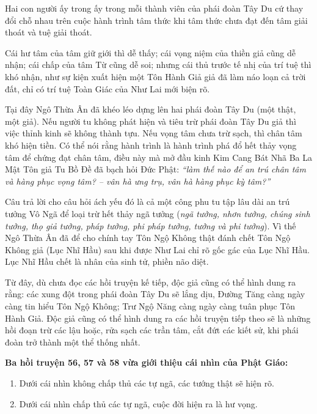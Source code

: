 Hai con người ấy trong ấy trong mỗi thành viên của phái đoàn Tây Du cứ thay đổi chỗ nhau trên cuộc hành trình tâm thức khi tâm thức chưa đạt đến tâm giải thoát và tuệ giải thoát.

Cái hư tâm của tâm giữ giới thì dễ thấy; cái vọng niệm của thiền giả cũng dễ nhận; cái chấp của tâm Từ cũng dễ soi; nhưng cái thủ trước tế nhị của trí tuệ thì khó nhận, như sự kiện xuất hiện một Tôn Hành Giả giả đã làm náo loạn cả trời đất, chỉ có trí tuệ Toàn Giác của Như Lai mới biện rõ.

Tại đây Ngô Thừa Ân đã khéo léo dựng lên hai phái đoàn Tây Du (một thật, một giả). Nếu người tu không phát hiện và tiêu trừ phái đoàn Tây Du giả thì việc thỉnh kinh sẽ không thành tựu. Nếu vọng tâm chưa trừ sạch, thì chân tâm khó hiện tiền. Có thể nói rằng hành trình là hành trình phá đổ hết thảy vọng tâm để chứng đạt chân tâm, điều này mà mở đầu kinh Kim Cang Bát Nhã Ba La Mật Tôn giả Tu Bồ Đề đã bạch hỏi Đức Phật: \emph{``làm thế nào để an trú chân tâm và hàng phục vọng tâm? -- vân hà ưng trụ, vân hà hàng phục kỳ tâm?''}

Câu trả lời cho câu hỏi ách yếu đó là cả một công phu tu tập lâu dài an trú tưởng Vô Ngã để loại trừ hết thảy ngã tưởng (\emph{ngã tưởng, nhơn tưởng, chúng sinh tưởng, thọ giả tưởng, pháp tưởng, phi pháp tưởng, tưởng và phi tưởng}). Vì thế Ngô Thừa Ân đã để cho chính tay Tôn Ngộ Không thật đánh chết Tôn Ngộ Không giả (Lục Nhĩ Hầu) sau khi được Như Lai chỉ rõ gốc gác của Lục Nhĩ Hầu. Lục Nhĩ Hầu chết là nhân của sinh tử, phiền não diệt.

Từ đây, dù chưa đọc các hồi truyện kế tiếp, độc giả cũng có thể hình dung ra rằng: các xung đột trong phái đoàn Tây Du sẽ lắng dịu, Đường Tăng càng ngày càng tin hiểu Tôn Ngộ Không; Trư Ngộ Năng càng ngày càng tuân phục Tôn Hành Giả. Độc giả cũng có thể hình dung ra các hồi truyện tiếp theo sẽ là những hồi đoạn trừ các lậu hoặc, rửa sạch các trần tâm, cắt đứt các kiết sử, khi phái đoàn trở thành một thể thống nhất.

{\bf Ba hồi truyện 56, 57 và 58 vừa giới thiệu cái nhìn của Phật Giáo:}

\begin{enumerate}[label=\itshape\alph*\upshape/]
    \item Dưới cái nhìn không chấp thủ các tự ngã, các tướng thật sẽ hiện rõ.

    \item Dưới cái nhìn chấp thủ các tự ngã, cuộc đời hiện ra là hư vọng.
\end{enumerate}

